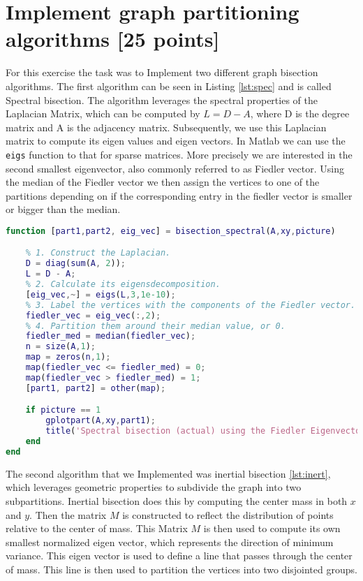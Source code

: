 \section{Implement graph partitioning algorithms [25 points]}
For this exercise the task was to Implement two different graph bisection algorithms. The first algorithm can be seen in Listing \ref{lst:spec} and is called Spectral bisection. The algorithm leverages the spectral properties of the Laplacian Matrix, which can be computed by $L = D-A$, where D is the degree matrix and A is the adjacency matrix. Subsequently, we use this Laplacian matrix to compute its eigen values and eigen vectors. In Matlab we can use the \texttt{eigs} function to that for sparse matrices. More precisely we are interested in the second smallest eigenvector, also commonly referred to as Fiedler vector. Using the median of the Fiedler vector we then assign the vertices to one of the partitions depending on if the corresponding entry in the fiedler vector is smaller or bigger than the median.
\begin{lstlisting}[language=Matlab, caption=Spectral graph bisection implementation, label=lst:spec]
function [part1,part2, eig_vec] = bisection_spectral(A,xy,picture)

	% 1. Construct the Laplacian.
	D = diag(sum(A, 2));
	L = D - A;
	% 2. Calculate its eigensdecomposition.
	[eig_vec,~] = eigs(L,3,1e-10);
	% 3. Label the vertices with the components of the Fiedler vector.
	fiedler_vec = eig_vec(:,2);
	% 4. Partition them around their median value, or 0.
	fiedler_med = median(fiedler_vec);
	n = size(A,1);
	map = zeros(n,1);
	map(fiedler_vec <= fiedler_med) = 0;
	map(fiedler_vec > fiedler_med) = 1;
	[part1, part2] = other(map);

	if picture == 1
		gplotpart(A,xy,part1);
		title('Spectral bisection (actual) using the Fiedler Eigenvector');
	end
end
\end{lstlisting}
The second algorithm that we Implemented was inertial bisection \ref{lst:inert}, which leverages geometric properties to subdivide the graph into two subpartitions.
Inertial bisection does this by computing the center mass in both $x$ and $y$. Then the matrix $M$ is constructed to reflect the distribution of points relative to the center of mass.
This Matrix $M$ is then used to compute its own smallest normalized eigen vector, which represents the direction of minimum variance.
This eigen vector is used to define a line that passes through the center of mass. This line is then used to partition the vertices into two disjointed groups.
